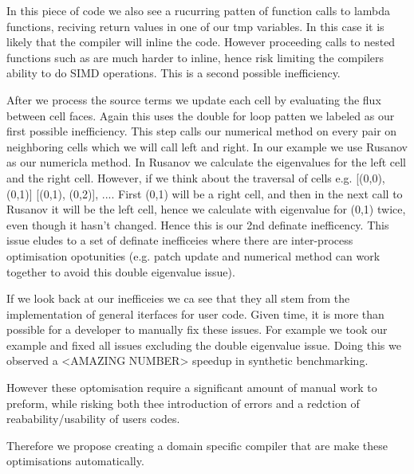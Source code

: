 In this piece of code we also see a rucurring patten of function calls to lambda functions, reciving return values in one of our tmp variables.
In this case it is likely that the compiler will inline the code.
However proceeding calls to nested functions such as  are much harder to inline, hence risk limiting the compilers ability to do SIMD operations.    
This is a second possible inefficiency.

After we process the source terms we update each cell by evaluating the flux between cell faces.
Again this uses the double for loop patten we labeled as our first possible inefficiency.
This step calls our numerical method on every pair on neighboring cells which we will call left and right.
In our example we use Rusanov as our numericla method.
In Rusanov we calculate the eigenvalues for the left cell and the right cell.
However, if we think about the traversal of cells e.g. [(0,0), (0,1)] [(0,1), (0,2)], .... First (0,1) will be a right cell, and then in the next call to Rusanov it will be the left cell, hence we calculate with eigenvalue for (0,1) twice, even though it hasn't changed.
Hence this is our 2nd definate inefficency.
This issue eludes to a set of definate inefficeies where there are inter-process optimisation opotunities (e.g. patch update and numerical method can work together to avoid this double eigenvalue issue).   


If we look back at our inefficeies we ca see that they all stem from the implementation of general iterfaces for user code.
Given time, it is more than possible for a developer to manually fix these issues.
For example we took our example and fixed all issues excluding the double eigenvalue issue.
Doing this we observed a <AMAZING NUMBER> speedup in synthetic benchmarking.

However these optomisation require a significant amount of manual work to preform, while risking both thee introduction of errors and a redction of reabability/usability of users codes.

Therefore we propose creating a domain specific compiler that are make these optimisations automatically.



